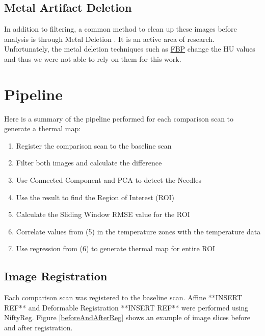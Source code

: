 \documentclass[]{spie}  %
\begin{document}
\subsection{Metal Artifact Deletion}

In addition to filtering, a common method to clean up these images before analysis is through Metal Deletion \cite{Boas11}. It is an active area of research. Unfortunately, the metal deletion techniques such as \href{http://www.mathworks.com/matlabcentral/fileexchange/34608-ct-reconstruction-package}{FBP} \cite{Bangert12} change the HU values and thus we were not able to rely on them for this work. 


\section{Pipeline}

Here is a summary of the pipeline performed for each comparison scan to generate a thermal map:
\begin{enumerate}
\item Register the comparison scan to the baseline scan
\item Filter both images and calculate the difference
\item Use Connected Component and PCA to detect the Needles
\item Use the result to find the Region of Interest (ROI)
\item Calculate the Sliding Window RMSE value for the ROI
\item Correlate values from (5) in the temperature zones with the temperature data
\item Use regression from (6) to generate thermal map for entire ROI
\end{enumerate}


\subsection{Image Registration} 

Each comparison scan was registered to the baseline scan. Affine **INSERT REF** and Deformable Registration **INSERT REF** were performed using NiftyReg. Figure \ref{beforeAndAfterReg} shows an example of image slices before and after registration. 
\end{document}
